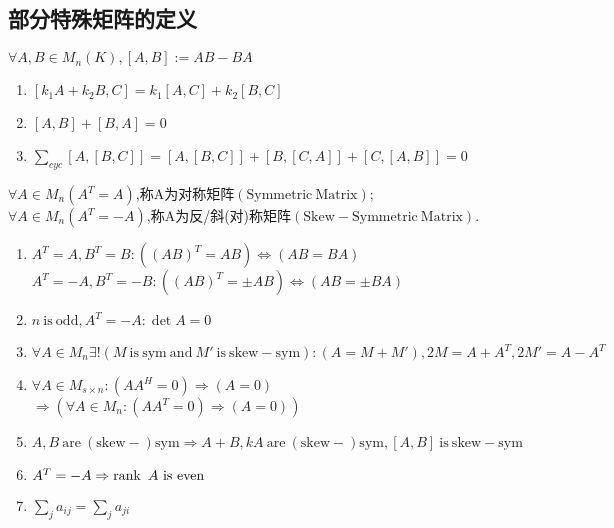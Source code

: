 \documentclass[UTF8,a4paper,notitlepage]{book}
\begin{document}
        \subsection{部分特殊矩阵的定义}
        \begin{definition}[换位元素]
            $\forall A,B\in M_n(K),[A,B]:=AB-BA $
        \end{definition}
        \begin{property}[换位元素的性质]\mbox{}\begin{enumerate}
                \item $[k_1A+k_2B,C]=k_1[A,C]+k_2[B,C]$
                \item $[A,B]+[B,A]=0$
                \item $\sum_{cyc}[A,[B,C]]=[A,[B,C]]+[B,[C,A]]+[C,[A,B]]=0$
        \end{enumerate}\end{property}
        \begin{definition}[Kronecker积]
        \end{definition}
        \begin{definition}
            $\forall A\in M_n(A^T=A)$,称A为对称矩阵$(\mathrm{Symmetric~Matrix})$;\\$\forall A\in M_n(A^T=-A)$,称A为反/斜(对)称矩阵$(\mathrm{Skew-Symmetric~Matrix})$.
        \end{definition}
        \begin{property}[对称和反称矩阵的性质]\mbox{}\begin{enumerate}
                \item $A^T=A,B^T=B:((AB)^T=AB)\Leftrightarrow(AB=BA)$\\ $A^T=-A,B^T=-B:((AB)^T=\pm AB)\Leftrightarrow(AB=\pm BA)$
                \item $n~\mathrm{is~odd},A^T=-A:\det A=0$
                \item $\forall A\in M_n\exists!(M~\mathrm{is~sym~and}~M'~\mathrm{is~skew-sym}):(A=M+M'),2M=A+A^T,2M'=A-A^T$
                \item $\forall A\in M_{s\times n}:(AA^H=0)\Rightarrow(A=0)$\\ $\Rightarrow(\forall A\in M_n:(AA^T=0)\Rightarrow(A=0))$
                \item $A,B~\mathrm{are~(skew-)sym}\Rightarrow A+B,kA~\mathrm{are~(skew-)sym},[A,B]~\mathrm{is~skew-sym}$
                \item $A^T=-A\Rightarrow \operatorname{rank}~A~\mathrm{is~even}$
                \item $\sum_j a_{ij}=\sum_j a_{ji}$
        \end{enumerate}\end{property}
\end{document}
